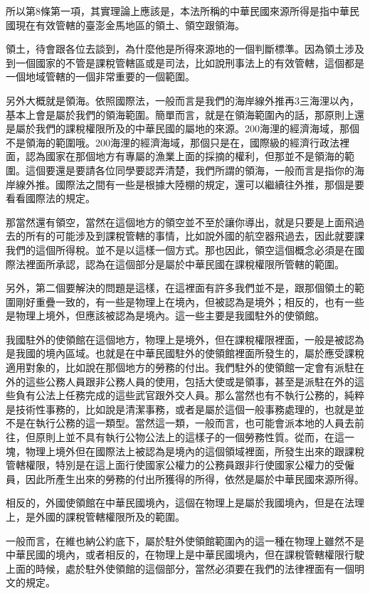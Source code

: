 \documentclass[]{ctexbook}
\begin{document}
所以第8條第一項，其實理論上應該是，本法所稱的中華民國來源所得是指中華民國現在有效管轄的臺澎金馬地區的領土、領空跟領海。

領土，待會跟各位去談到，為什麼他是所得來源地的一個判斷標準。因為領土涉及到一個國家的不管是課稅管轄區或是司法，比如說刑事法上的有效管轄，這個都是一個地域管轄的一個非常重要的一個範圍。

另外大概就是領海。依照國際法，一般而言是我們的海岸線外推再3三海浬以內，基本上會是屬於我們的領海範圍。簡單而言，就是在領海範圍內的話，那原則上還是屬於我們的課稅權限所及的中華民國的屬地的來源。200海浬的經濟海域，那個不是領海的範圍哦。200海浬的經濟海域，那個只是在，國際級的經濟行政法裡面，認為國家在那個地方有專屬的漁業上面的採摘的權利，但那並不是領海的範圍。這個要還是要請各位同學要認弄清楚，我們所謂的領海，一般而言是指你的海岸線外推。國際法之間有一些是根據大陸棚的規定，還可以繼續往外推，那個是要看看國際法的規定。

那當然還有領空，當然在這個地方的領空並不至於讓你導出，就是只要是上面飛過去的所有的可能涉及到課稅管轄的事情，比如說外國的航空器飛過去，因此就要課我們的這個所得稅。並不是以這樣一個方式。那也因此，領空這個概念必須是在國際法裡面所承認，認為在這個部分是屬於中華民國在課稅權限所管轄的範圍。

另外，第二個要解決的問題是這樣，在這裡面有許多我們並不是，跟那個領土的範圍剛好重疊一致的，有一些是物理上在境內，但被認為是境外；相反的，也有一些是物理上境外，但應該被認為是境內。這一些主要是我國駐外的使領館。

我國駐外的使領館在這個地方，物理上是境外，但在課稅權限裡面，一般是被認為是我國的境內區域。也就是在中華民國駐外的使領館裡面所發生的，屬於應受課稅適用對象的，比如說在那個地方的勞務的付出。我們駐外的使領館一定會有派駐在外的這些公務人員跟非公務人員的使用，包括大使或是領事，甚至是派駐在外的這些負有公法上任務完成的這些武官跟外交人員。那么當然也有不執行公務的，純粹是技術性事務的，比如說是清潔事務，或者是屬於這個一般事務處理的，也就是並不是在執行公務的這一類型。當然這一類，一般而言，也可能會派本地的人員去前往，但原則上並不具有執行公物公法上的這樣子的一個勞務性質。從而，在這一塊，物理上境外但在國際法上被認為是境內的這個領域裡面，所發生出來的跟課稅管轄權限，特別是在這上面行使國家公權力的公務員跟非行使國家公權力的受僱員，因此所產生出來的勞務的付出所獲得的所得，依然是屬於中華民國來源所得。

相反的，外國使領館在中華民國境內，這個在物理上是屬於我國境內，但是在法理上，是外國的課稅管轄權限所及的範圍。

一般而言，在維也納公約底下，屬於駐外使領館範圍內的這一種在物理上雖然不是中華民國的境內，或者相反的，在物理上是中華民國境內，但在課稅管轄權限行駛上面的時候，處於駐外使領館的這個部分，當然必須要在我們的法律裡面有一個明文的規定。
\end{document}
